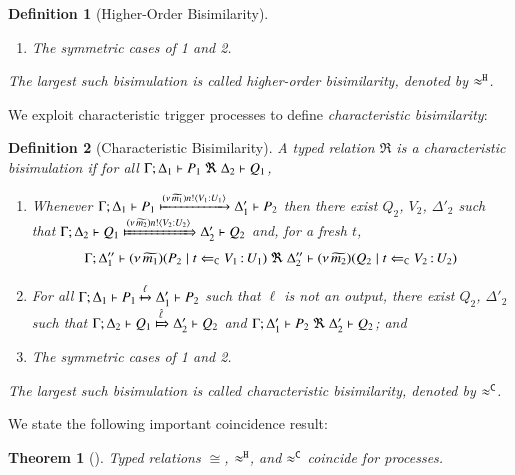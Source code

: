 \documentclass[preprint,11pt]{elsarticle}
\newtheorem{definition}{Definition}[section]
\newtheorem{theorem}{Theorem}[section]
\begin{document}
{\begin{definition}[Higher-Order Bisimilarity]
\begin{enumerate}[1)]
		\item	The symmetric cases of 1 and 2.                
	\end{enumerate}
%
	The largest such bisimulation is called \emph{higher-order bisimilarity}, denoted by $\approx^\mathtt{H}$.
\end{definition}


We exploit characteristic trigger processes to define \emph{characteristic bisimilarity}: 

\begin{definition}[Characteristic Bisimilarity]
\label{d:fwb}
	A typed relation $\Re$ is a {\em  characteristic bisimulation} if 
	for all $\horel{\Gamma}{\Delta_1}{P_1}{\ \Re \ }{\Delta_2}{Q_1}$, 
%
	\begin{enumerate}[1)]
		\item 
				Whenever 
				$\Gamma; \Delta_1 \vdash P_1 \xmapsto{(\nu\, \widetilde{m_1}) n !\langle V_1: U_1 \rangle} \Delta_1' \vdash P_2$ 
				then there exist 
				$Q_2$, $V_2$, $\Delta'_2$ such that 
				$\horel{\Gamma}{\Delta_2}{Q_1}{\Hby{\news{\widetilde{m_2}}\bactout{n}{V_2: U_2}}}{\Delta_2'}{Q_2}$
				and, for a fresh $t$,
%
				\[
					\Gamma; \Delta''_1  \proves  {\newsp{\widetilde{m_1}}{P_2 \Par \ftrigger{t}{V_1}{U_1}}}
	 				\ \Re\ 
					\Delta''_2 \proves {\newsp{\widetilde{m_2}}{Q_2 \Par \ftrigger{t}{V_2}{U_2}}}
				\]

		\item	
				For all $\Gamma; \Delta_1 \vdash P_1 \xmapsto{\ell} \Delta_1' \vdash P_2$ such that 
				$\ell$ is not an output, there exist $Q_2$, $\Delta'_2$ such that 
				$\horel{\Gamma}{\Delta_2}{Q_1}{\Hby{\hat{\ell}}}{\Delta_2'}{Q_2}$
				and
				$\horel{\Gamma}{\Delta_1'}{P_2}{\ \Re \ }{\Delta_2'}{Q_2}$; and 

		\item	The symmetric cases of 1 and 2.                
	\end{enumerate}
%
	The largest such bisimulation is called \emph{characteristic bisimilarity}, denoted by $\approx^\mathtt{C}$.
\end{definition}




We state the following important coincidence result: %
\begin{theorem}[\cite{KouzapasPY17}]\label{t:coincide}
	Typed relations $\cong$, $\approx^\mathtt{H}$, and $\approx^\mathtt{C}$ coincide for \HOp processes.
\end{theorem}


}
\end{document}
